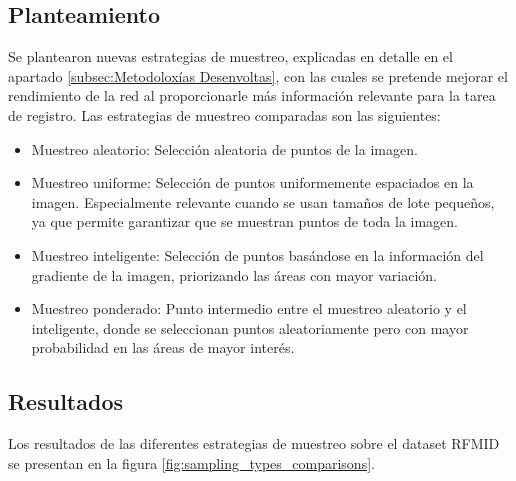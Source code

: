 \subsection{Planteamiento}
\label{subsec:Plantexamento-sampling}

Se plantearon nuevas estrategias de muestreo, explicadas en detalle en el apartado \ref{subsec:Metodoloxías Desenvoltas}, con las cuales se pretende mejorar el rendimiento de la red al proporcionarle más información relevante para la tarea de registro.
Las estrategias de muestreo comparadas son las siguientes:
\begin{itemize}
    \item Muestreo aleatorio: Selección aleatoria de puntos de la imagen.
    \item Muestreo uniforme: Selección de puntos uniformemente espaciados en la imagen. Especialmente relevante cuando se usan tamaños de lote pequeños, ya que permite garantizar que se muestran puntos de toda la imagen.
    \item Muestreo inteligente: Selección de puntos basándose en la información del gradiente de la imagen, priorizando las áreas con mayor variación.
    \item Muestreo ponderado: Punto intermedio entre el muestreo aleatorio y el inteligente, donde se seleccionan puntos aleatoriamente pero con mayor probabilidad en las áreas de mayor interés.
\end{itemize}

\subsection{Resultados}
\label{subsec:Resultados-sampling}

Los resultados de las diferentes estrategias de muestreo sobre el dataset RFMID se presentan en la figura \ref{fig:sampling_types_comparisons}.

